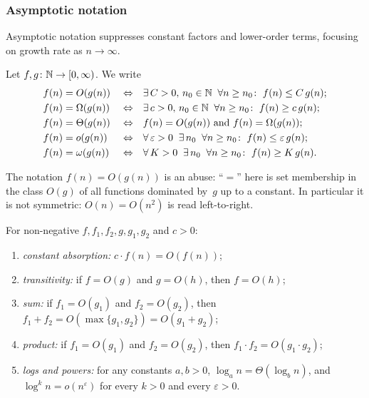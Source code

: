 \subsubsection*{Asymptotic notation}

Asymptotic notation suppresses constant factors and lower-order terms,
focusing on growth rate as $n \to \infty$.

\begin{definition}
\label{def:asymptotic}
Let $f, g \colon \mathbb{N} \to [0, \infty)$. We write
\begin{align*}
  f(n) &= O(g(n))      &&\Leftrightarrow&& \exists\, C > 0,\, n_0 \in \mathbb{N} \;\;\forall n \geq n_0\colon\; f(n) \leq C\, g(n);\\
  f(n) &= \Omega(g(n)) &&\Leftrightarrow&& \exists\, c > 0,\, n_0 \in \mathbb{N} \;\;\forall n \geq n_0\colon\; f(n) \geq c\, g(n);\\
  f(n) &= \Theta(g(n)) &&\Leftrightarrow&& f(n) = O(g(n)) \text{ and } f(n) = \Omega(g(n));\\
  f(n) &= o(g(n))      &&\Leftrightarrow&& \forall\, \varepsilon > 0\;\; \exists\, n_0\;\;\forall n \geq n_0\colon\; f(n) \leq \varepsilon\, g(n);\\
  f(n) &= \omega(g(n)) &&\Leftrightarrow&& \forall\, K > 0\;\; \exists\, n_0\;\;\forall n \geq n_0\colon\; f(n) \geq K\, g(n).
\end{align*}
\end{definition}

\begin{remark}
The notation $f(n) = O(g(n))$ is an abuse: ``$=$'' here is set
membership in the class $O(g)$ of all functions dominated by~$g$ up
to a constant. In particular it is not symmetric: $O(n) = O(n^2)$
is read left-to-right.
\end{remark}

\begin{proposition}[Properties of $O$]
\label{prop:big-o-rules}
For non-negative $f, f_1, f_2, g, g_1, g_2$ and $c > 0$:
\begin{enumerate}[label=(\alph*)]
  \item \emph{constant absorption:} $c \cdot f(n) = O(f(n))$;
  \item \emph{transitivity:} if $f = O(g)$ and $g = O(h)$, then $f = O(h)$;
  \item \emph{sum:} if $f_1 = O(g_1)$ and $f_2 = O(g_2)$, then $f_1 + f_2 = O(\max\{g_1, g_2\}) = O(g_1 + g_2)$;
  \item \emph{product:} if $f_1 = O(g_1)$ and $f_2 = O(g_2)$, then $f_1 \cdot f_2 = O(g_1 \cdot g_2)$;
  \item \emph{logs and powers:} for any constants $a, b > 0$,
        $\log_a n = \Theta(\log_b n)$, and $\log^k n = o(n^\varepsilon)$
        for every $k > 0$ and every $\varepsilon > 0$.
\end{enumerate}
\end{proposition}

